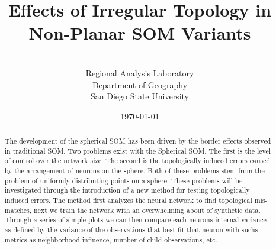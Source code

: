 \documentclass[11pt]{article}
\title{Effects of Irregular Topology in Non-Planar SOM Variants}
\author{\sc{Charles R. Schmidt}\\Regional Analysis Laboratory\\Department of Geography\\San Diego State University}
\date{\today} %
\begin{document}
\maketitle
\begin{abstract}
The development of the spherical SOM has been driven by the border effects
observed in traditional SOM.  Two problems exist with the Spherical SOM. The
first is the level of control over the network size. The second is the
topologically induced errors caused by the arrangement of neurons on the sphere.
Both of these problems stem from the problem of uniformly distributing points on
a sphere. These problems will be investigated through the introduction of a new method for
testing topologically induced errors. The method first analyzes  the neural
network to find topological mis-matches, next we train the network with an
overwhelming about of synthetic data.  Through a series of simple plots we can
then compare each neurons internal variance as defined by the variance of the
observations that best fit that neuron with suchs metrics as neighborhood
influence, number of child observations, etc.
\end{abstract}


\end{document}
